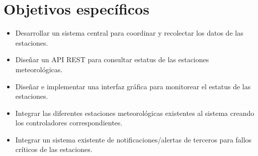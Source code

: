 \section{Objetivos específicos}

\begin{itemize}

   \item Desarrollar un sistema central para coordinar y recolectar los datos de las estaciones.

   \item Diseñar un API REST para consultar estatus de las estaciones meteorológicas.

   \item Diseñar e implementar una interfaz gráfica para monitorear el estatus de las estaciones.

   \item Integrar las diferentes estaciones meteorológicas existentes al sistema creando los controladores correspondientes.

   \item Integrar un sistema existente de notificaciones/alertas de terceros para fallos críticos de las estaciones.
\end{itemize}
